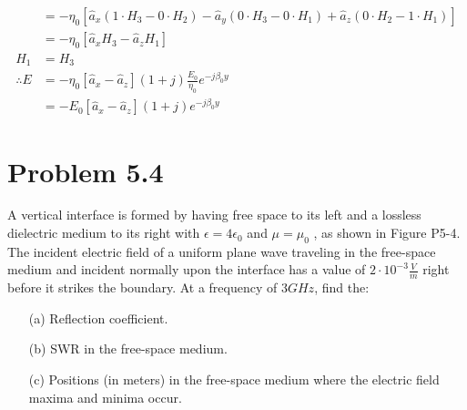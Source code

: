 \documentclass[12pt]{article}
\begin{document}
\begin{itemize}
  \begin{align*}
    &= -\eta_0[\hat a_x(1\cdot H_3 -0\cdot H_2) -\hat a_y(0\cdot H_3-0\cdot H_1) + \hat a_z(0\cdot H_2-1\cdot H_1) ]\\
    &= -\eta_0[\hat a_xH_3  - \hat a_zH_1 ]\\
    H_1 &= H_3 \\
    \therefore E &= -\eta_0[\hat a_x  - \hat a_z](1+j)\frac{E_0}{\eta_0}e^{-j \beta_0y}\\
    &= -E_0[\hat a_x  - \hat a_z](1+j)e^{-j \beta_0y}
  \end{align*}
\end{itemize}

\section*{Problem 5.4}
A vertical interface is formed by having free space to its left and a lossless dielectric medium to its right with $\epsilon = 4\epsilon_0$ and $\mu = \mu_0$ , as shown in Figure P5-4. The incident electric field of a uniform plane wave traveling in the free-space medium and incident normally upon the interface has a value of $2\cdot 10^{−3} \frac{V}{m}$ right before it strikes the boundary. At a frequency of $3 GHz$, find the:

\begin{center}

\end{center}
\begin{itemize}
  \item[(a)] Reflection coefficient.
\item[(b)] SWR in the free-space medium.
\item[(c)] Positions (in meters) in the free-space
medium where the electric field maxima
and minima occur.
\end{itemize}
\end{document}
